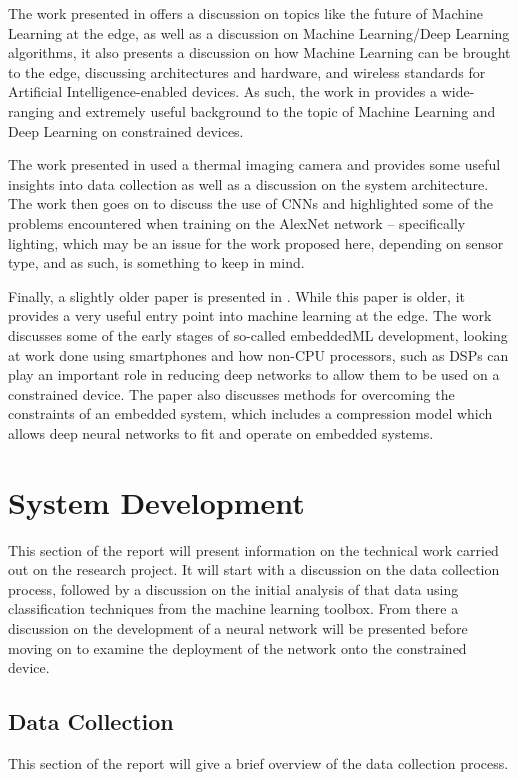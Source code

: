 \documentclass[conference]{IEEEtran}
\begin{document}
The work presented in \cite{b18} offers a discussion on topics like the future of Machine Learning at the edge, as well as a discussion on Machine Learning/Deep Learning algorithms, it also presents a discussion on how Machine Learning can be brought to the edge, discussing architectures and hardware, and wireless standards for Artificial Intelligence-enabled devices. As such, the work in \cite{b18} provides a wide-ranging and extremely useful background to the topic of Machine Learning and Deep Learning on constrained devices. 

The work presented in \cite{b19} used a thermal imaging camera and provides some useful insights into data collection as well as a discussion on the system architecture. The work then goes on to discuss the use of CNNs and highlighted some of the problems encountered when training on the AlexNet network – specifically lighting, which may be an issue for the work proposed here, depending on sensor type, and as such, is something to keep in mind.


Finally, a slightly older paper is presented in \cite{b20}. While this paper is older, it provides a very useful entry point into machine learning at the edge. The work discusses some of the early stages of so-called embeddedML development, looking at work done using smartphones and how non-CPU processors, such as DSPs can play an important role in reducing deep networks to allow them to be used on a constrained device. The paper also discusses methods for overcoming the constraints of an embedded system, which includes a compression model which allows deep neural networks to fit and operate on embedded systems. 

\section{System Development}
This section of the report will present information on the technical work carried out on the research project. It will start with a discussion on the data collection process, followed by a discussion on the initial analysis of that data using classification techniques from the machine learning toolbox. From there a discussion on the development of a neural network will be presented before moving on to examine the deployment of the network onto the constrained device.

\subsection{Data Collection}
This section of the report will give a brief overview of the data collection process.
\end{document}
